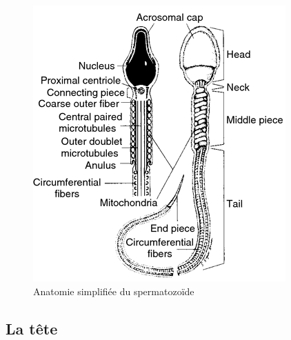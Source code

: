 \documentclass[12pt,twoside]{reedthesis}
\theoremstyle{definition}
\theoremstyle{definition}
\theoremstyle{remark}
\begin{document}
  \begin{figure}
  
  {\centering \includegraphics[scale=.75]{figure/sperm_anatomy} 
  
  }
  
  \caption[Anatomie simplifiée du spermatozoïde]{Anatomie simplifiée du spermatozoïde}\label{fig:spz}
  \end{figure}
  
  \newpage
  
  \subsection{La tête}\label{la-tete}
  
\end{document}
